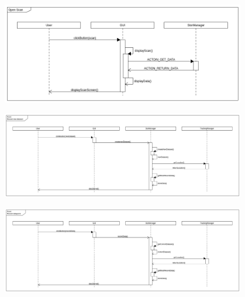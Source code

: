 \includegraphics[width=0.8\textwidth]{diagramms/scan.png}

\includegraphics[width=0.8\textwidth]{diagramms/newDataset.png}

\includegraphics[width=0.8\textwidth]{diagramms/recordDatapoint.png}
